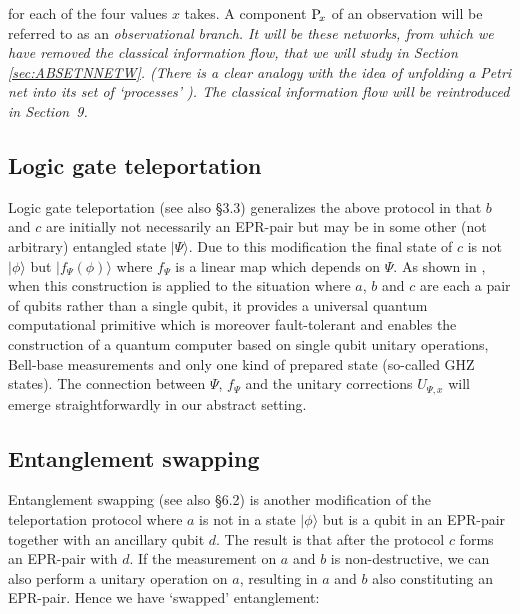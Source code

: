 \documentclass[10pt]{article}
\begin{document}
\vspace{0mm}\noindent
for each of the four values $x$ takes.
A component ${\rm P}_{\!x}$ of an 
observation will be referred to as an
\em observational branch\em. It will
be these networks, from which we have
removed the classical
information flow, that we will
study in Section
\ref{sec:ABSETNNETW}.  (There
is a clear analogy with the idea of
unfolding a Petri net into its set
of `processes' \cite{Petri}).
The
classical information flow will be
reintroduced in Section~9.

\subsection{Logic gate teleportation}

Logic gate teleportation \cite{Gottesman} (see also \cite{Coe1} \S 3.3) generalizes the above protocol in
that $b$ and $c$ are initially not necessarily an EPR-pair but may be in some other (not arbitrary)
entangled state $|\Psi\rangle$.  Due to this modification the final state of $c$ is not
$|\phi\rangle$ but
$|f_\Psi(\phi)\rangle$ where $f_\Psi$ is a linear map which depends on $\Psi$.  As
shown in \cite{Gottesman}, when  this construction is applied to the
situation where  $a$, $b$ and $c$ are  each a pair of qubits rather
than a single
qubit, it provides a universal quantum computational
primitive which is moreover fault-tolerant \cite{Shor} and enables
the construction of a quantum computer based on single qubit unitary operations,
Bell-base measurements and only one kind of prepared state (so-called GHZ states).
The connection between $\Psi$, $f_\Psi$ and the unitary corrections $U_{\Psi\!,x}$ will
emerge straightforwardly in our abstract setting.

\subsection{Entanglement swapping}

Entanglement swapping \cite{Swap} (see also \cite{Coe1} \S 6.2) is another
modification of the
teleportation protocol where $a$ is not in a state $|\phi\rangle$ but is a
qubit in an
EPR-pair together with an ancillary qubit $d$.  The result is that after
the protocol $c$ forms an EPR-pair
with $d$. If the measurement on $a$ and $b$ is non-destructive, we can also
perform a
unitary operation on $a$, resulting in  $a$ and $b$ also constituting
an EPR-pair.
Hence we have `swapped' entanglement:
 
\end{document}
